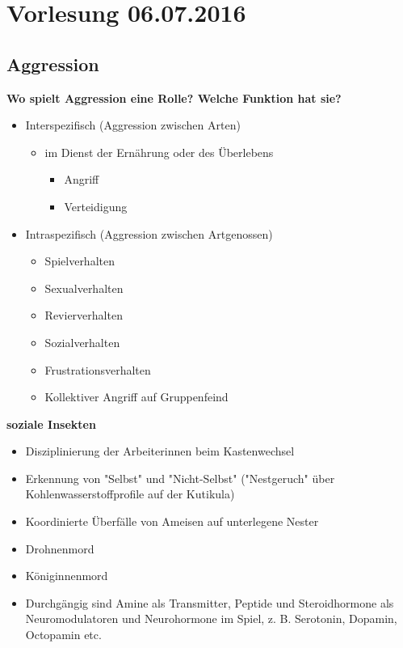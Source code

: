 \section{Vorlesung 06.07.2016}

\subsection{Aggression}

\textbf{Wo spielt Aggression eine Rolle? Welche Funktion hat sie?}\\
\begin{itemize}
	\item Interspezifisch (Aggression zwischen Arten)
	\begin{itemize}
		\item im Dienst der Ernährung oder des Überlebens
		\begin{itemize}
			\item Angriff
			\item Verteidigung
		\end{itemize}
	\end{itemize}
	\item Intraspezifisch (Aggression zwischen Artgenossen)
	\begin{itemize}
		\item Spielverhalten
		\item Sexualverhalten
		\item Revierverhalten
		\item Sozialverhalten
		\item Frustrationsverhalten
		\item Kollektiver Angriff auf Gruppenfeind
	\end{itemize}
\end{itemize}

\textbf{soziale Insekten}
\begin{itemize}
	\item Disziplinierung der Arbeiterinnen beim Kastenwechsel
	\item Erkennung von "Selbst" und "Nicht-Selbst" ("Nestgeruch" über Kohlenwasserstoffprofile auf der Kutikula)
	\item Koordinierte Überfälle von Ameisen auf unterlegene Nester
	\item Drohnenmord
	\item Königinnenmord
	\item Durchgängig sind Amine als Transmitter, Peptide und Steroidhormone als Neuromodulatoren und Neurohormone im Spiel, z. B. Serotonin, Dopamin, Octopamin etc.
\end{itemize}

